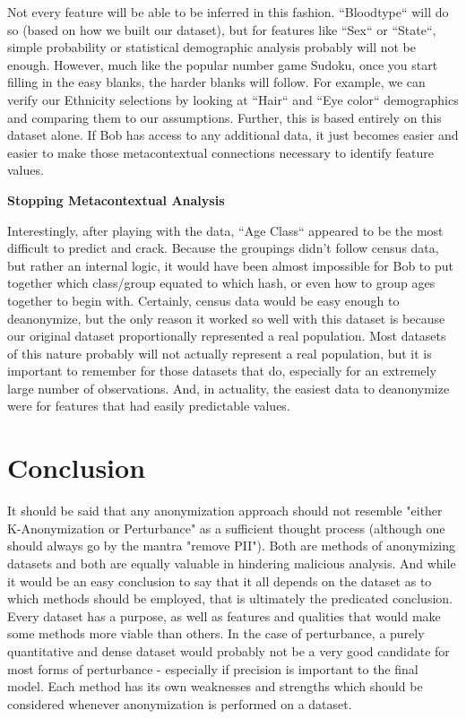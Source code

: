\documentclass[10pt,journal,compsoc]{IEEEtran}
\begin{document}
Not every feature will be able to be inferred in this fashion. ``Bloodtype`` will do so (based on how we built our dataset), but for features like ``Sex`` or ``State``, simple probability or statistical demographic analysis probably will not be enough. However, much like the popular number game Sudoku, once you start filling in the easy blanks, the harder blanks will follow. For example, we can verify our Ethnicity selections by looking at ``Hair`` and ``Eye color`` demographics and comparing them to our assumptions. Further, this is based entirely on this dataset alone. If Bob has access to any additional data, it just becomes easier and easier to make those metacontextual connections necessary to identify feature values.\linebreak

\noindent \textbf{Stopping Metacontextual Analysis}

Interestingly, after playing with the data, ``Age Class`` appeared to be the most difficult to predict and crack. Because the groupings didn't follow census data, but rather an internal logic, it would have been almost impossible for Bob to put together which class/group equated to which hash, or even how to group ages together to begin with.
Certainly, census data would be easy enough to deanonymize, but the only reason it worked so well with this dataset is because our original dataset proportionally represented a real population. Most datasets of this nature probably will not actually represent a real population, but it is important to remember for those datasets that do, especially for an extremely large number of observations. And, in actuality, the easiest data to deanonymize were for features that had easily predictable values.

	

\section{Conclusion}

It should be said that any anonymization approach should not resemble "either K-Anonymization or Perturbance" as a sufficient thought process (although one should always go by the mantra "remove PII"). Both are methods of anonymizing datasets and both are equally valuable in hindering malicious analysis. And while it would be an easy conclusion to say that it all depends on the dataset as to which methods should be employed, that is ultimately the predicated conclusion. Every dataset has a purpose, as well as features and qualities that would make some methods more viable than others. In the case of perturbance, a purely quantitative and dense dataset would probably not be a very good candidate for most forms of perturbance - especially if precision is important to the final model. Each method has its own weaknesses and strengths which should be considered whenever anonymization is performed on a dataset.
\end{document}
